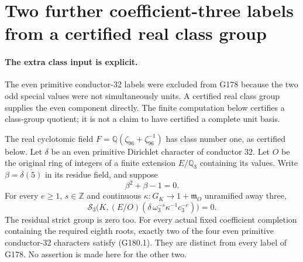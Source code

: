 \section{Two further coefficient-three labels from a certified real class group}
\label{sec:coefficient-three-conductor32-half}

\paragraph{The extra class input is explicit.}
The even primitive conductor-32 labels were excluded from G178 because
the two odd special values were not simultaneously units.
A certified real class group supplies the even component directly.
The finite computation below certifies a class-group quotient;
it is not a claim to have certified a complete unit basis.

\begin{theorem}
\label{AC-G180}
The real cyclotomic field $F=\mathbb Q(\zeta_{96}+\zeta_{96}^{-1})$
has class number one, as certified below.
Let $\delta$ be an even primitive Dirichlet character of conductor $32$.
Let $O$ be the original ring of integers of a finite extension
$E/\mathbb Q_3$ containing its values.  Write
$\beta=\overline{\delta(5)}$ in its residue field, and suppose
\[
                           \beta^2+\beta-1=0.
 \tag{G180.1}
\]
For every $e\geq1$, $s\in\mathbb Z$ and continuous
$\kappa:G_K\to1+\mathfrak m_O$ unramified away three,
\[
 \mathcal S_3\bigl(K,(E/O)
              (\delta\,\omega_3^{-s}\kappa^{-1}c_3^{-e})\bigr)=0.
 \tag{G180.2}
\]
The residual strict group is zero too.
For every actual fixed coefficient completion containing the required
eighth roots, exactly two of the four even primitive conductor-32
characters satisfy (G180.1).  They are distinct from every label of
G178.  No assertion is made here for the other two.
\end{theorem}

